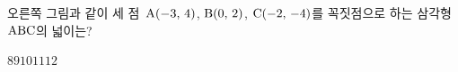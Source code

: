 \noindent\begin{minipage}[t]{0.58\linewidth}\vspace{0pt}\raggedright 오른쪽 그림과 같이 세 점~$\mathrm{A}(-3,\mkern3mu 4)$, $\mathrm{B}(0,\mkern3mu 2)$, $\mathrm{C}(-2,\mkern3mu -4)$를 꼭짓점으로 하는 삼각형~$\mathrm{ABC}$의 넓이는?\end{minipage}\hfill\begin{minipage}[t]{0.4\linewidth}\vspace{0pt}\centering \resizebox{\ifdim\width>\linewidth\linewidth\else\width\fi}{!}{}\end{minipage}\par
\begin{choicesii}{$8$}{$9$}{$10$}{$11$}{$12$}\end{choicesii}
